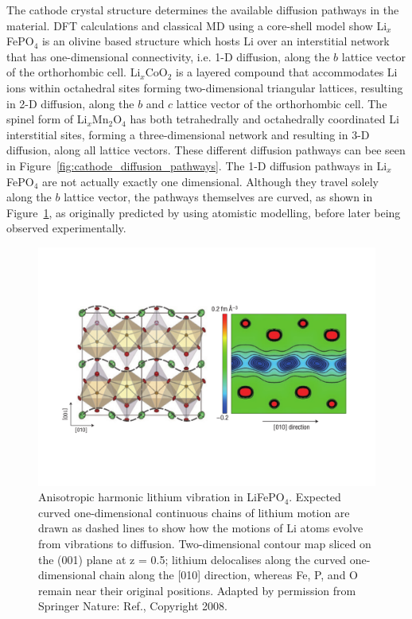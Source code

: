 \documentclass[../main.tex]{subfiles}
\begin{document}
The cathode crystal structure determines the available diffusion pathways in the material. DFT calculations\cite{Morgan2004,ouyang2004first} and classical MD using a core-shell model\cite{islam2005atomic} show Li$_x$FePO$_4$ is an olivine based structure which hosts Li over an interstitial network that has one-dimensional connectivity, i.e. 1-D diffusion, along the $b$ lattice vector of the orthorhombic cell.\cite{amin2006anisotropy} Li$_x$CoO$_2$ is a layered compound that accommodates Li ions within octahedral sites forming two-dimensional triangular lattices, resulting in 2-D diffusion, along the $b$ and $c$ lattice vector of the orthorhombic cell. \cite{van2000lithium} The spinel form of Li$_x$Mn$_2$O$_4$ has both tetrahedrally and octahedrally coordinated Li interstitial sites, forming a three-dimensional network and resulting in 3-D diffusion, along all lattice vectors. \cite{thackeray1997manganese,proell20123d} These different diffusion pathways can bee seen in Figure~\ref{fig:cathode_diffusion_pathways}. The 1-D diffusion pathways in Li$_x$FePO$_4$ are not actually exactly one dimensional. Although they travel solely along the $b$ lattice vector, the pathways themselves are curved, as shown in Figure~\ref{fig:curved_pathways}, as originally predicted by \citeauthor{islam2005atomic} using atomistic modelling,\cite{islam2005atomic} before later being observed experimentally.\cite{nishimura2008experimental}

\begin{figure}
    \centering
    \includegraphics[scale=0.5]{figures/curved_1D_paths.pdf}
    \caption{Anisotropic harmonic lithium vibration in LiFePO$_4$. Expected curved one-dimensional continuous chains of lithium motion are drawn as dashed lines to show how the motions of Li atoms evolve from vibrations to diffusion. Two-dimensional contour map sliced on the (001) plane at z = 0.5; lithium delocalises along the curved one-dimensional chain along the [010] direction, whereas Fe, P, and O remain near their original positions.
    Adapted by permission from Springer Nature: Ref., Copyright 2008.}
    \label{fig:curved_pathways}
\end{figure}
\end{document}
